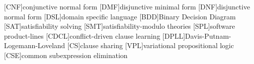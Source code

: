 \begin{acronym}[]
  [CNF]{conjunctive normal form}
  [DMF]{disjunctive minimal form}
  [DNF]{disjunctive normal form}
  [DSL]{domain specific language}
  [BDD]{Binary Decision Diagram}
  [SAT]{satisfiability solving}
  [SMT]{satisfiability-modulo theories}
  [SPL]{software product-lines}
  [CDCL]{conflict-driven clause learning}
  [DPLL]{Davis-Putnam-Logemann-Loveland}
  [CS]{clause sharing}
  [VPL]{variational propositional logic}
  [CSE]{common subexpression elimination}
\end{acronym}